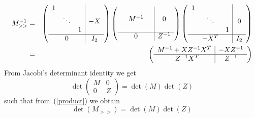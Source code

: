 \documentclass[a4paper]{article}
\begin{document}
\begin{eqnarray}
M_{>>}^{-1}&=&
\left(
\begin{array}{ccc|c}
1	&	 &	&        \\
	& \ddots &	& -X     \\
	&	 &  1	&        \\
\hline
	& 0      &      & I_{2}  \\
\end{array}
\right)
\left(
\begin{array}{ccc|c}
	&	 &	&        \\
	& M^{-1} &	& 0      \\
	&	 & 	&        \\
\hline
	& 0      &      & Z^{-1} \\
\end{array}
\right)
\left(
\begin{array}{ccc|c}
1	&	 &	&        \\
	& \ddots &	& 0      \\
	&	 & 1	&        \\
\hline
	& -X^{T} &      & I_{2}  \\
\end{array}
\right)  
\nonumber \\
&=&
\label{eq:inv_expand_by_2}
\left(
\begin{array}{c|c}
M^{-1}+XZ^{-1}X^{T} & -XZ^{-1}   \\
\hline
-Z^{-1}X^{T}        & Z^{-1}
\end{array}
\right)
\end{eqnarray}
From Jacobi's determinant identity we get 
\begin{equation}
\det
\left(
\begin{array}{c|c}
M & 0 \\
\hline
0 & Z
\end{array}
\right)
=
\det\left(M\right)\det\left(Z\right)
\end{equation}
such that from~(\ref{product}) we obtain
\begin{equation}
\label{eq:det_id_Z2_Z3}
\det\left(M_{>>}\right) = \det\left(M\right)\det\left(Z\right)
\end{equation}
\end{document}
